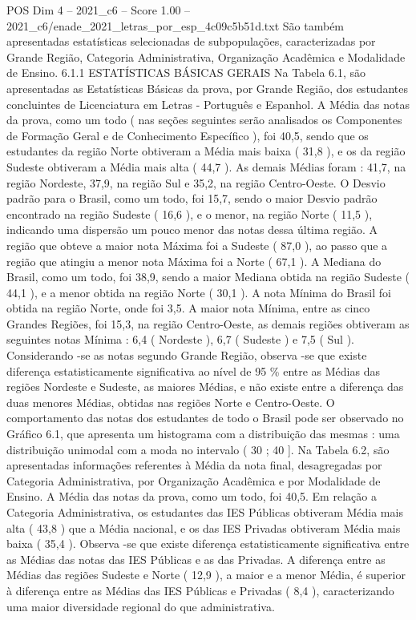 \begin{textsample}{POS Dim 4 – 2021\_c6 – Score 1.00 – 2021\_c6/enade\_2021\_letras\_por\_esp\_4c09c5b51d.txt}
São também apresentadas estatísticas selecionadas de subpopulações, caracterizadas por Grande Região, Categoria Administrativa, Organização Acadêmica e Modalidade de Ensino. 6.1.1 ESTATÍSTICAS BÁSICAS GERAIS Na Tabela 6.1, são apresentadas as Estatísticas Básicas da prova, por Grande Região, dos estudantes concluintes de Licenciatura em Letras - Português e Espanhol.
A Média das notas da prova, como um todo ( nas seções seguintes serão analisados os Componentes de Formação Geral e de Conhecimento Específico ), foi 40,5, sendo que os estudantes da região Norte obtiveram a Média mais baixa ( 31,8 ), e os da região Sudeste obtiveram a Média mais alta ( 44,7 ).
As demais Médias foram : 41,7, na região Nordeste, 37,9, na região Sul e 35,2, na região Centro-Oeste.
O Desvio padrão para o Brasil, como um todo, foi 15,7, sendo o maior Desvio padrão encontrado na região Sudeste ( 16,6 ), e o menor, na região Norte ( 11,5 ), indicando uma dispersão um pouco menor das notas dessa última região.
A região que obteve a maior nota Máxima foi a Sudeste ( 87,0 ), ao passo que a região que atingiu a menor nota Máxima foi a Norte ( 67,1 ).
A Mediana do Brasil, como um todo, foi 38,9, sendo a maior Mediana obtida na região Sudeste ( 44,1 ), e a menor obtida na região Norte ( 30,1 ).
A nota Mínima do Brasil foi obtida na região Norte, onde foi 3,5.
A maior nota Mínima, entre as cinco Grandes Regiões, foi 15,3, na região Centro-Oeste, as demais regiões obtiveram as seguintes notas Mínima : 6,4 ( Nordeste ), 6,7 ( Sudeste ) e 7,5 ( Sul ).
Considerando -se as notas segundo Grande Região, observa -se que existe diferença estatisticamente significativa ao nível de 95 \% entre as Médias das regiões Nordeste e Sudeste, as maiores Médias, e não existe entre a diferença das duas menores Médias, obtidas nas regiões Norte e Centro-Oeste.
O comportamento das notas dos estudantes de todo o Brasil pode ser observado no Gráfico 6.1, que apresenta um histograma com a distribuição das mesmas : uma distribuição unimodal com a moda no intervalo ( 30 ; 40 ].
Na Tabela 6.2, são apresentadas informações referentes à Média da nota final, desagregadas por Categoria Administrativa, por Organização Acadêmica e por Modalidade de Ensino.
A Média das notas da prova, como um todo, foi 40,5.
Em relação a Categoria Administrativa, os estudantes das IES Públicas obtiveram Média mais alta ( 43,8 ) que a Média nacional, e os das IES Privadas obtiveram Média mais baixa ( 35,4 ).
Observa -se que existe diferença estatisticamente significativa entre as Médias das notas das IES Públicas e as das Privadas.
A diferença entre as Médias das regiões Sudeste e Norte ( 12,9 ), a maior e a menor Média, é superior à diferença entre as Médias das IES Públicas e Privadas ( 8,4 ), caracterizando uma maior diversidade regional do que administrativa.

\end{textsample}
